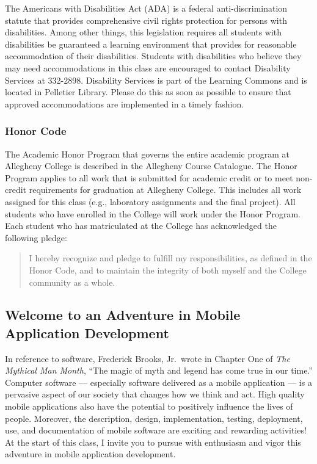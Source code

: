 The Americans with Disabilities Act (ADA) is a federal anti-discrimination statute that provides comprehensive civil
rights protection for persons with disabilities.  Among other things, this legislation requires all students with
disabilities be guaranteed a learning environment that provides for reasonable accommodation of their disabilities.
Students with disabilities who believe they may need accommodations in this class are encouraged to contact Disability
Services at 332-2898.  Disability Services is part of the Learning Commons and is located in Pelletier Library.
Please do this as soon as possible to ensure that approved accommodations are implemented in a timely fashion.

\subsubsection*{Honor Code}

The Academic Honor Program that governs the entire academic program at Allegheny College is described in the Allegheny
Course Catalogue.  The Honor Program applies to all work that is submitted for academic credit or to meet non-credit
requirements for graduation at Allegheny College.  This includes all work assigned for this class (e.g., laboratory 
assignments and the final project).  All students who have enrolled in the College will work under the Honor Program.
Each student who has matriculated at the College has acknowledged the following pledge:

\vspace*{-.1in}
\begin{quote}
I hereby recognize and pledge to fulfill my responsibilities, as defined in the Honor Code, and to maintain the
integrity of both myself and the College community as a whole.  
\end{quote}
\vspace*{-.15in}

\subsection*{Welcome to an Adventure in Mobile Application Development}

In reference to software, Frederick Brooks, Jr.\ wrote in Chapter One of {\em The Mythical Man Month}, ``The magic of
myth and legend has come true in our time.'' Computer software --- especially software delivered as a mobile application
--- is a pervasive aspect of our society that changes how we think and act.  High quality mobile applications also have
the potential to positively influence the lives of people. Moreover, the description, design, implementation, testing,
deployment, use, and documentation of mobile software are exciting and rewarding activities!  At the start of this class, I
invite you to pursue with enthusiasm and vigor this adventure in mobile application development.


